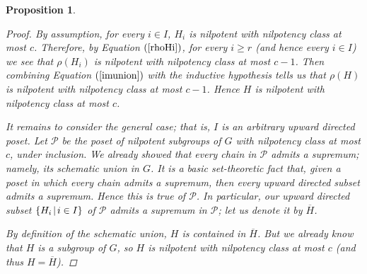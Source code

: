 \documentclass[twoside,a4paper,reqno,11pt]{amsart}
\newtheorem{proposition}[theorem]{Proposition}
\theoremstyle{definition}
\begin{document}
\begin{proposition}
\begin{proof}
\vspace{1mm}\noindent By assumption, for every $i\in I$, $H_i$ is nilpotent with nilpotency class at most $c$. Therefore, by Equation $(\ref{rhoHi})$, for every $i\geq r$ (and hence every $i\in I$) we see that $\rho(H_i)$ is nilpotent with nilpotency class at most $c-1$. Then combining Equation $(\ref{imunion})$ with the inductive hypothesis tells us that $\rho(H)$ is nilpotent with nilpotency class at most $c-1$. Hence $H$ is nilpotent with nilpotency class at most $c$. %

\vspace{2mm}\noindent It remains to consider the general case; that is, $I$ is an arbitrary upward directed poset. Let $\mathcal{P}$ be the poset of nilpotent subgroups of $G$ with nilpotency class at most $c$, under inclusion. We already showed that every chain in $\mathcal{P}$ admits a supremum; namely, its schematic union in $G$. %
It is a basic set-theoretic fact that, given a poset in which every chain admits a supremum, then every upward directed subset admits a supremum. %
Hence this is true of $\mathcal{P}$. In particular, our upward directed subset $\{H_i \hspace{0.5mm}|\hspace{0.5mm}i\in I\}$ of $\mathcal{P}$ admits a supremum in $\mathcal{P}$; let us denote it by $\overline{H}$.

\vspace{2mm}\noindent By definition of the schematic union, $H$ is contained in $\overline{H}$. But we already know that $H$ is a subgroup of $G$, so $H$ is nilpotent with nilpotency class at most $c$ (and thus $H=\overline{H}$).
\end{proof}
\end{proposition}
\end{document}
